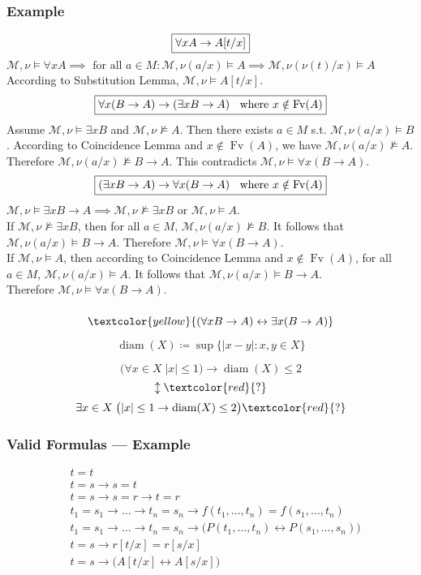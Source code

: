 \documentclass[UTF8,11pt,colorlinks,compress,openany]{beamer}%
\begin{document}
\begin{frame}\frametitle{Example}\vspace*{-2ex}
\[\fbox{$\forall x A\to A[t/x]$}\]
$\mathcal{M},\nu\vDash\forall x A\implies\mbox{ for all } a\in M: \mathcal{M},\nu(a/x)\vDash A\implies\mathcal{M},\nu(\nu(t)/x)\vDash A$\\
According to Substitution Lemma, $\mathcal{M},\nu\vDash A[t/x]$.
\[\fbox{$\forall x(B\to A)\to(\exists x B\to A)\;\; \mbox{ where } x\notin\operatorname{Fv}(A)$}\]
Assume $\mathcal{M},\nu\vDash\exists x B$ and $\mathcal{M},\nu\nvDash A$. Then there exists $a\in M$ s.t. $\mathcal{M},\nu(a/x)\vDash B$. According to Coincidence Lemma and $x\notin\operatorname{Fv}(A)$, we have $\mathcal{M},\nu(a/x)\nvDash A$. Therefore $\mathcal{M},\nu(a/x)\nvDash B\to A$. This contradicts $\mathcal{M},\nu\vDash\forall x(B\to A)$.
\[\fbox{$(\exists x B\to A)\to\forall x(B\to A)\;\; \mbox{ where } x\notin\operatorname{Fv}(A)$}\]
$\mathcal{M},\nu\vDash\exists x B\to A\implies\mathcal{M},\nu\nvDash\exists x B\mbox{ or }\mathcal{M},\nu\vDash A$.\\
If $\mathcal{M},\nu\nvDash\exists x B$, then for all $a\in M$, $\mathcal{M},\nu(a/x)\nvDash B$. It follows that $\mathcal{M},\nu(a/x)\vDash B\to A$. Therefore $\mathcal{M},\nu\vDash\forall x(B\to A)$.\\
If $\mathcal{M},\nu\vDash A$, then according to Coincidence Lemma and $x\notin\operatorname{Fv}(A)$, for all $a\in M$, $\mathcal{M},\nu(a/x)\vDash A$. It follows that $\mathcal{M},\nu(a/x)\vDash B\to A$.\\
Therefore $\mathcal{M},\nu\vDash\forall x(B\to A)$.
\end{frame}

\begin{frame}\frametitle{}
\[\textcolor{yellow}{(\forall x B\to A)\leftrightarrow \exists x(B\to A)}\]

\[\operatorname{diam}(X)\coloneqq \sup\big\{|x-y|:x,y\in X\big\}\]

\[\big(\forall x\in X \; |x|\leq 1\big)\to \operatorname{diam}(X)\leq 2\]
\[\updownarrow \textcolor{red}{?}\]
\[\exists x\in X\; \big(|x|\leq 1\to \operatorname{diam}(X)\leq 2\big) \textcolor{red}{?}\]
\end{frame}

\begin{frame}\frametitle{Valid Formulas --- Example}
	\begin{align*}
	&t=t\\
	&t=s\to s=t\\
	&t=s\to s=r\to t=r\\
	&t_1=s_1\to\dots\to t_n=s_n\to f(t_1,\dots,t_n)=f(s_1,\dots,t_n)\\
	&t_1=s_1\to\dots\to t_n=s_n\to \bigl(P(t_1,\dots,t_n)\leftrightarrow P(s_1,\dots,s_n)\bigr)\\
	&t=s\to r[t/x]=r[s/x]\\
	&t=s\to\bigl(A[t/x]\leftrightarrow A[s/x]\bigr)
	\end{align*}
\end{frame}
\end{document}
